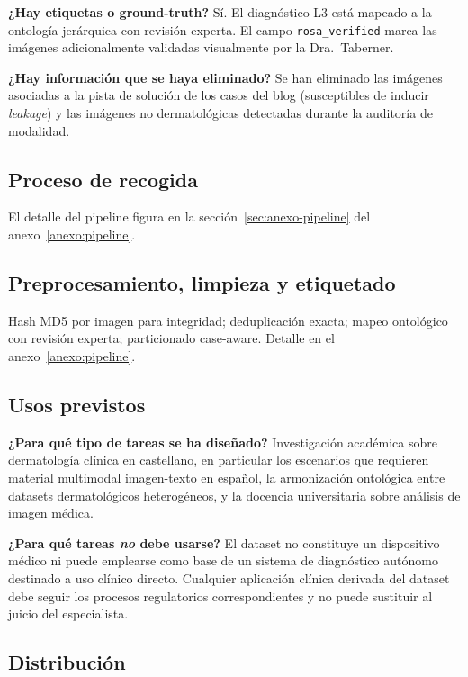 \textbf{¿Hay etiquetas o ground-truth?} Sí. El diagnóstico L3 está
mapeado a la ontología jerárquica con revisión experta. El campo
\texttt{rosa\_verified} marca las imágenes adicionalmente validadas
visualmente por la Dra.~Taberner.

\textbf{¿Hay información que se haya eliminado?} Se han eliminado
las imágenes asociadas a la pista de solución de los casos del blog
(susceptibles de inducir \emph{leakage}) y las imágenes no
dermatológicas detectadas durante la auditoría de modalidad.

\subsection*{Proceso de recogida}

El detalle del pipeline figura en la
sección~\ref{sec:anexo-pipeline} del anexo~\ref{anexo:pipeline}.

\subsection*{Preprocesamiento, limpieza y etiquetado}

Hash MD5 por imagen para integridad; deduplicación exacta; mapeo
ontológico con revisión experta; particionado case-aware. Detalle en
el anexo~\ref{anexo:pipeline}.

\subsection*{Usos previstos}

\textbf{¿Para qué tipo de tareas se ha diseñado?} Investigación
académica sobre dermatología clínica en castellano, en particular
los escenarios que requieren material multimodal imagen-texto en
español, la armonización ontológica entre datasets dermatológicos
heterogéneos, y la docencia universitaria sobre análisis de
imagen médica.

\textbf{¿Para qué tareas \emph{no} debe usarse?} El dataset no
constituye un dispositivo médico ni puede emplearse como base de
un sistema de diagnóstico autónomo destinado a uso clínico
directo. Cualquier aplicación clínica derivada del dataset debe
seguir los procesos regulatorios correspondientes y no puede
sustituir al juicio del especialista.

\subsection*{Distribución}

